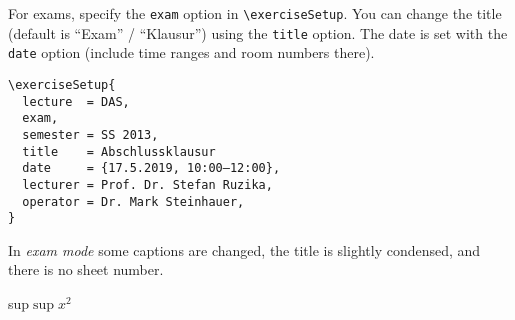 \documentclass[german]{mhexsheet}
\begin{document}
\maketitle
For exams, specify the \verb|exam| option in \verb|\exerciseSetup|. You can change the title (default is \enquote{Exam} / \enquote{Klausur}) using the \verb|title| option. The date is set with the \verb|date| option (include time ranges and room numbers there).

\begin{verbatim}
\exerciseSetup{
  lecture  = DAS,    
  exam,              
  semester = SS 2013,
  title    = Abschlussklausur
  date     = {17.5.2019, 10:00–12:00},
  lecturer = Prof. Dr. Stefan Ruzika,
  operator = Dr. Mark Steinhauer,
}
\end{verbatim}
In \emph{exam mode} some captions are changed, the title is slightly condensed, and there is no sheet number.
\begin{exercise}[points=10]
sup$\sup x^2$
\end{exercise}

\begin{solution}[points=3+3+4]


\end{solution}

\begin{exercise}
\end{exercise}
\end{document}
